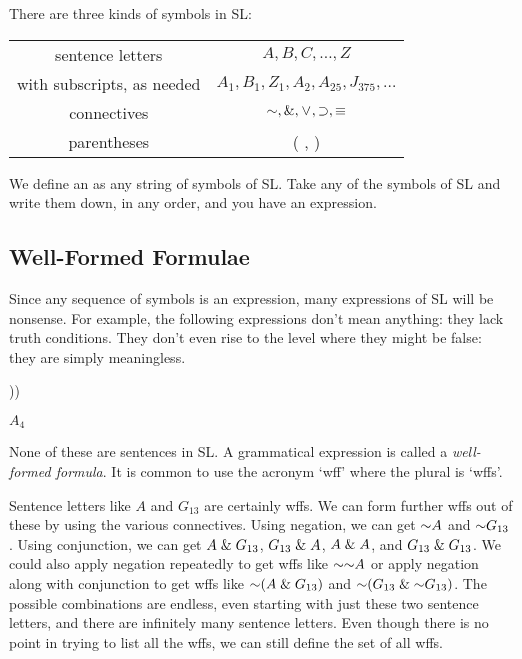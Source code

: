 There are three kinds of symbols in SL:

\begin{center}
\begin{tabular}{|c|c|}
\hline
sentence letters & $A,B,C,\ldots,Z$\\
with subscripts, as needed & $A_1, B_1,Z_1,A_2,A_{25},J_{375},\ldots$\\
\hline
connectives & $\enot,\eand,\eor,\eif,\eiff$\\
\hline
parentheses&( , )\\
\hline
\end{tabular}
\end{center}

We define an  as any string of symbols of SL. Take any of the symbols of SL and write them down, in any order, and you have an expression.


\subsection{Well-Formed Formulae}
\label{sec:wff}

Since any sequence of symbols is an expression, many expressions of SL will be nonsense. For example, the following expressions don't mean anything: {\color{black}they lack truth conditions. They don't even rise to the level where they might be false: they are simply meaningless.}

\begin{earg}
  \item[] \enot\enot\enot\enot
  \item[] ))\eiff
  \item[] $A_4$ \eor
\end{earg}

None of these are sentences in SL.
A grammatical expression is called a \textit{well-formed formula}.
It is common to use the acronym `wff' where the plural is `wffs'.

Sentence letters like $A$ and $G_{13}$ are certainly wffs.
We can form further wffs out of these by using the various connectives.
Using negation, we can get $\enot A$ and $\enot G_{13}$.
Using conjunction, we can get $A \mathrel\& G_{13}$, $G_{13} \mathrel\& A$, $A \mathrel\& A$, and $G_{13} \mathrel\& G_{13}$.
We could also apply negation repeatedly to get wffs like $\enot \enot A$ or apply negation along with conjunction to get wffs like $\enot(A \eand G_{13})$ and $\enot(G_{13} \eand \enot G_{13})$.
The possible combinations are endless, even starting with just these two sentence letters, and there are infinitely many sentence letters.
Even though there is no point in trying to list all the wffs, we can still define the set of all wffs.

